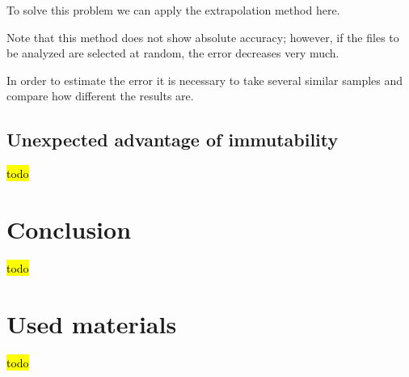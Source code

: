 \documentclass[anonymous,sigplan,review,11pt,nonacm,natbib=false]{acmart}
\begin{document}
    To solve this problem we can apply the extrapolation method here.

    Note that this method does not show absolute accuracy; however, if the files to be analyzed are selected at random, the error decreases very much.

    In order to estimate the error it is necessary to take several similar samples and compare how different the results are.

    \subsection{Unexpected advantage of immutability}

    \hl{todo}

    \section{Conclusion}\label{sec:conclusion}

    \hl{todo}

    \section{Used materials}

    \hl{todo}

    \printbibliography
\end{document}
